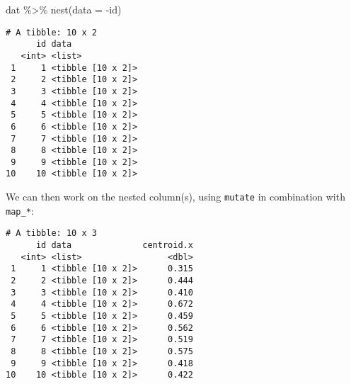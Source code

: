 \documentclass[ignorenonframetext,,t]{beamer}
\newenvironment{Shaded}{\begin{snugshade}}{\end{snugshade}}
\newcommand{\AttributeTok}[1]{\textcolor[rgb]{0.77,0.63,0.00}{#1}}
\newcommand{\FunctionTok}[1]{\textcolor[rgb]{0.00,0.00,0.00}{#1}}
\newcommand{\NormalTok}[1]{#1}
\newcommand{\SpecialCharTok}[1]{\textcolor[rgb]{0.00,0.00,0.00}{#1}}
\begin{document}
\begin{frame}[fragile]
\begin{Shaded}
\begin{Highlighting}[]
\NormalTok{dat }\SpecialCharTok{\%\textgreater{}\%} \FunctionTok{nest}\NormalTok{(}\AttributeTok{data =} \SpecialCharTok{{-}}\NormalTok{id)}
\end{Highlighting}
\end{Shaded}

\begin{verbatim}
# A tibble: 10 x 2
      id data             
   <int> <list>           
 1     1 <tibble [10 x 2]>
 2     2 <tibble [10 x 2]>
 3     3 <tibble [10 x 2]>
 4     4 <tibble [10 x 2]>
 5     5 <tibble [10 x 2]>
 6     6 <tibble [10 x 2]>
 7     7 <tibble [10 x 2]>
 8     8 <tibble [10 x 2]>
 9     9 <tibble [10 x 2]>
10    10 <tibble [10 x 2]>
\end{verbatim}
\end{frame}

\begin{frame}[fragile]
We can then work on the nested column(s), using \texttt{mutate} in
combination with \texttt{map\_*}:

\begin{Shaded}
\end{Shaded}

\begin{verbatim}
# A tibble: 10 x 3
      id data              centroid.x
   <int> <list>                 <dbl>
 1     1 <tibble [10 x 2]>      0.315
 2     2 <tibble [10 x 2]>      0.444
 3     3 <tibble [10 x 2]>      0.410
 4     4 <tibble [10 x 2]>      0.672
 5     5 <tibble [10 x 2]>      0.459
 6     6 <tibble [10 x 2]>      0.562
 7     7 <tibble [10 x 2]>      0.519
 8     8 <tibble [10 x 2]>      0.575
 9     9 <tibble [10 x 2]>      0.418
10    10 <tibble [10 x 2]>      0.422
\end{verbatim}
\end{frame}
\end{document}
